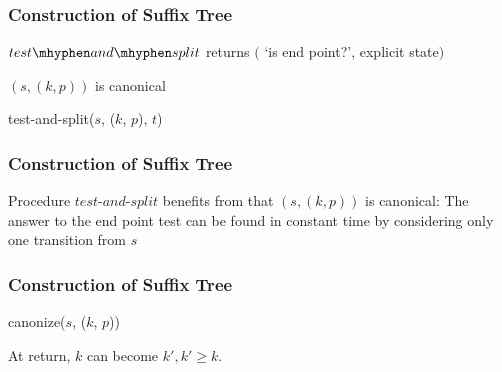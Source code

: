 \documentclass[compress,usenames,dvipsnames]{beamer}
\let\oldnl\nl%
\newcommand{\nonl}{\renewcommand{\nl}{\let\nl\oldnl}}%
\begin{document}
    \begin{frame}\frametitle{Construction of Suffix Tree}
        $test\mhyphen and \mhyphen split$ returns $($ `is end point?', explicit state$)$ \\
        \hfill \break
        \LinesNumbered
        \begin{procedure}[H]
            \SetAlgoNoEnd
            \nonl $(s, (k, p))$ is canonical
            \caption{test-and-split($s$, ($k$, $p$), $t$)}
        \end{procedure}
    \end{frame}

    \begin{frame}\frametitle{Construction of Suffix Tree}
        Procedure $test$-$and$-$split$ benefits from that $(s, (k, p))$ is canonical: The answer to the end point test can be found in constant time by considering only one transition from $s$
    \end{frame}

    \begin{frame}\frametitle{Construction of Suffix Tree}
        \LinesNumbered
        \begin{procedure}[H]
            \SetAlgoNoEnd
            \caption{canonize($s$, ($k$, $p$))}
            \DontPrintSemicolon
            \PrintSemicolon
        \end{procedure}
        \hfill \break
        At return, $k$ can become $k', k' \geq k$.
    \end{frame}
\end{document}
